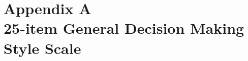 \documentclass[12pt]{article} %
\begin{document}
\bibnewpage

\raggedright
\doublespacing
\setlength\bibhang{.5in}
  
  

  \newpage
  \appendix
  \setlength{\parskip}{0pt}
  \titlespacing*{\section}{0pt}{0pt}{-15pt}
  \section*{\centering\normalsize\textnormal{Appendix A\\ 25-item General Decision Making Style Scale}}
  \label{appendix:GDMS}
  \singlespacing
\setlength{\extrarowheight}{3pt}
\end{document}
